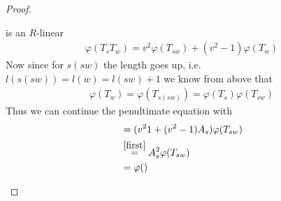 \documentclass[]{article}
\begin{document}
\begin{proof}
\begin{enumerate}
        is an \(R\)-linear
        \begin{align*}
            \varphi(T_s T_w) = v^2 \varphi(T_{sw}) + (v^2 -1) \varphi(T_w)
        \end{align*}
        Now since for \(s(sw)\) the length goes up, i.e. \(l(s(sw))= l(w)= l(sw)+1\) we know from above that
        \begin{align*}
            \varphi(T_w)=\varphi(T_{s(sw)})=\varphi(T_s) \varphi(T_{sw})
        \end{align*}
        Thus we can continue the penultimate equation with
        \begin{align*}
            &= (v^2 1 + (v^2-1)A_s)\varphi(T_{sw}) \\
            &\overset{\ref{first}}{=} A_s^2 \varphi(T_{sw}) \\
            &= \varphi()
        \end{align*}

    \end{enumerate}
\end{proof}
\end{document}
